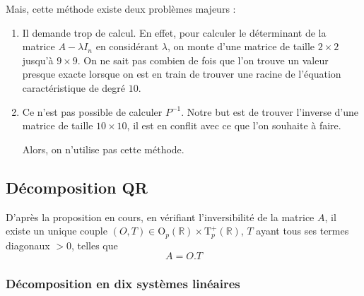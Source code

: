 \documentclass{article}
\begin{document}
Mais, cette méthode existe deux problèmes majeurs :
\begin{enumerate}
    \item Il demande trop de calcul. En effet, pour calculer le déterminant de la matrice $A-\lambda I_n$ en considérant $\lambda$, on monte d'une matrice de taille $2 \times 2$ jusqu'à $9 \times 9$. On ne sait pas combien de fois que l'on trouve un valeur presque exacte lorsque on est en train de trouver une racine de l'équation caractéristique de degré $10$.

    \item Ce n'est pas possible de calculer $P^{-1}$. Notre but est de trouver l'inverse d'une matrice de taille  $10 \times 10$, il est en conflit avec ce que l'on souhaite à faire.

Alors, on n'utilise pas cette méthode.
\end{enumerate}
\newpage

\subsection{Décomposition QR}




D'après la proposition en cours, en vérifiant l'inversibilité de la matrice $A$, il existe un unique couple $(O, T) \in \mathrm{O} _p(\mathbb{R} ) \times  \mathrm{T} _p^+ (\mathbb{R})$, $T$ ayant tous ses termes diagonaux $>0$, telles que \[
A = O.T
\]

\subsubsection{Décomposition en dix systèmes linéaires}
\end{document}
